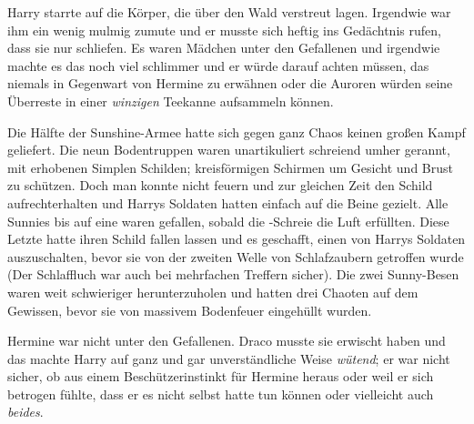 \later

Harry starrte auf die Körper, die über den Wald verstreut lagen. Irgendwie war ihm ein wenig mulmig zumute und er musste sich heftig ins Gedächtnis rufen, dass sie nur schliefen. Es waren Mädchen unter den Gefallenen und irgendwie machte es das noch viel schlimmer und er würde darauf achten müssen, das niemals in Gegenwart von Hermine zu erwähnen oder die Auroren würden seine Überreste in einer \emph{winzigen} Teekanne aufsammeln können.

Die Hälfte der Sunshine-Armee hatte sich gegen ganz Chaos keinen großen Kampf geliefert. Die neun Bodentruppen waren unartikuliert schreiend umher gerannt, mit erhobenen Simplen Schilden; kreisförmigen Schirmen um Gesicht und Brust zu schützen. Doch man konnte nicht feuern und zur gleichen Zeit den Schild aufrechterhalten und Harrys Soldaten hatten einfach auf die Beine gezielt. Alle Sunnies bis auf eine waren gefallen, sobald die -Schreie die Luft erfüllten. Diese Letzte hatte ihren Schild fallen lassen und es geschafft, einen von Harrys Soldaten auszuschalten, bevor sie von der zweiten Welle von Schlafzaubern getroffen wurde (Der Schlaffluch war auch bei mehrfachen Treffern sicher). Die zwei Sunny-Besen waren weit schwieriger herunterzuholen und hatten drei Chaoten auf dem Gewissen, bevor sie von massivem Bodenfeuer eingehüllt wurden.

Hermine war nicht unter den Gefallenen. Draco musste sie erwischt haben und das machte Harry auf ganz und gar unverständliche Weise \emph{wütend}; er war nicht sicher, ob aus einem Beschützerinstinkt für Hermine heraus oder weil er sich betrogen fühlte, dass er es nicht selbst hatte tun können oder vielleicht auch \emph{beides}.

